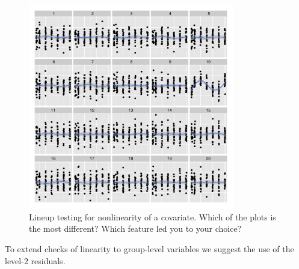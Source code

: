 \documentclass[12pt]{article} %
\newcommand{\alnote}[1]{\todo[inline,color=green!40]{#1}} %
\begin{document}
\begin{figure}
	\centering
	\includegraphics[width=0.8\textwidth]{dialyzernonlinear-10.pdf}
	\caption{\label{fig:linearity} Lineup testing  for nonlinearity of a covariate. Which of the plots is the most different? Which feature led you to your choice?}

\end{figure}

To extend checks of linearity to group-level variables we suggest the use of the level-2 residuals. 
\end{document}
